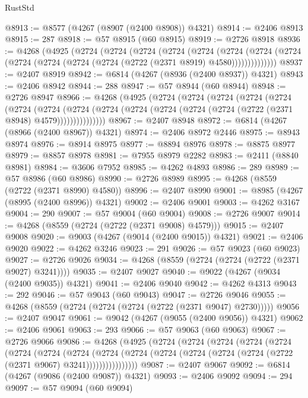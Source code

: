 \begin{lexlean}{RustStd}
\begin{coremodule}
@8913 := @8577 (@4267 (@8907 (@2400 @8908)) @4321)
@8914 := @2406 @8913
@8915 := 287
@8918 := @57 @8915 (@60 @8915)
@8919 := @2726 @8918
@8936 := @4268
    (@4925
      (@2724
        (@2724
          (@2724
            (@2724
              (@2724
                (@2724
                  (@2724 (@2724 (@2724 (@2724 (@2724 (@2724 (@2722 (@2371 @8919) @4580))))))))))))))
@8937 := @2407 @8919
@8942 := @6814 (@4267 (@8936 (@2400 @8937)) @4321)
@8943 := @2406 @8942
@8944 := 288
@8947 := @57 @8944 (@60 @8944)
@8948 := @2726 @8947
@8966 := @4268
    (@4925
      (@2724
        (@2724
          (@2724
            (@2724
              (@2724
                (@2724
                  (@2724
                    (@2724
                      (@2724 (@2724 (@2724 (@2724 (@2724 (@2722 (@2371 @8948) @4579)))))))))))))))
@8967 := @2407 @8948
@8972 := @6814 (@4267 (@8966 (@2400 @8967)) @4321)
@8974 := @2406 @8972 @2446
@8975 := @8943 @8974
@8976 := @8914 @8975
@8977 := @8894 @8976
@8978 := @8875 @8977
@8979 := @8857 @8978
@8981 := @7955 @8979 @2282
@8983 := @2411 (@8840 @8981)
@8984 := @3606 @7952
@8985 := @4262 @4893
@8986 := 289
@8989 := @57 @8986 (@60 @8986)
@8990 := @2726 @8989
@8995 := @4268 (@8559 (@2722 (@2371 @8990) @4580))
@8996 := @2407 @8990
@9001 := @8985 (@4267 (@8995 (@2400 @8996)) @4321)
@9002 := @2406 @9001
@9003 := @4262 @3167
@9004 := 290
@9007 := @57 @9004 (@60 @9004)
@9008 := @2726 @9007
@9014 := @4268 (@8559 (@2724 (@2722 (@2371 @9008) @4579)))
@9015 := @2407 @9008
@9020 := @9003 (@4267 (@9014 (@2400 @9015)) @4321)
@9021 := @2406 @9020
@9022 := @4262 @3246
@9023 := 291
@9026 := @57 @9023 (@60 @9023)
@9027 := @2726 @9026
@9034 := @4268 (@8559 (@2724 (@2724 (@2722 (@2371 @9027) @3241))))
@9035 := @2407 @9027
@9040 := @9022 (@4267 (@9034 (@2400 @9035)) @4321)
@9041 := @2406 @9040
@9042 := @4262 @4313
@9043 := 292
@9046 := @57 @9043 (@60 @9043)
@9047 := @2726 @9046
@9055 := @4268 (@8559 (@2724 (@2724 (@2724 (@2722 (@2371 @9047) @2730)))))
@9056 := @2407 @9047
@9061 := @9042 (@4267 (@9055 (@2400 @9056)) @4321)
@9062 := @2406 @9061
@9063 := 293
@9066 := @57 @9063 (@60 @9063)
@9067 := @2726 @9066
@9086 := @4268
    (@4925
      (@2724
        (@2724
          (@2724
            (@2724
              (@2724
                (@2724
                  (@2724
                    (@2724
                      (@2724
                        (@2724
                          (@2724 (@2724 (@2724 (@2724 (@2722 (@2371 @9067) @3241))))))))))))))))
@9087 := @2407 @9067
@9092 := @6814 (@4267 (@9086 (@2400 @9087)) @4321)
@9093 := @2406 @9092
@9094 := 294
@9097 := @57 @9094 (@60 @9094)

\end{coremodule}
\end{lexlean}
